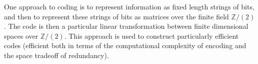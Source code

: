 \documentclass{memoir}
\begin{document}
One approach to coding is to represent information as fixed length strings of bits, and then to represent these strings of bits as matrices over the finite field $\mathbb{Z}/(2)$. The code is then a particular linear transformation between finite dimensional spaces over $\mathbb{Z}/(2)$. This approach is used to construct particularly efficient codes (efficient both in terms of the computational complexity of encoding and the space tradeoff of redundancy).
\end{document}
